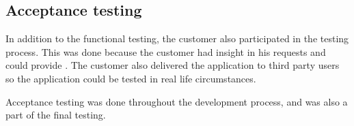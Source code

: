 \subsection{Acceptance testing}
In addition to the functional testing, the customer also participated in the testing process. This was done because the customer had insight in his requests and could provide . The customer also delivered the application to third party users so the application could be tested in real life circumstances.

Acceptance testing was done throughout the development process, and was also a part of the final testing.
